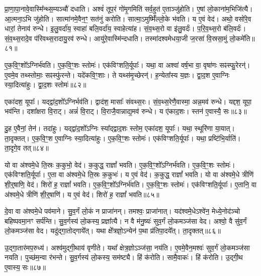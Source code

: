 प्रा॒णा॒पा॒नावे॒वास्मि᳚न्थ्स॒म्यञ्चौ॑ दधाति।
अश्वं॑ तूप॒रं गो॑मृ॒गमिति॑ सर्व॒हुत॑ ए॒ताञ्जु॑होति।
ए॒षां लो॒काना॑म॒भिजि॑त्यै।
आ॒त्मना॒ऽभि जु॑\-होति।
सात्मा॑नमे॒वैन॒ꣳ॒ सत॑नुं करोति।
सात्मा॒\-ऽमुष्मिँ॑ल्लो॒के भ॑वति।
य ए॒वं वेद॑।
अथो॒ वसो॑रे॒व धारां॒ तेनाव॑ रुन्धे।
इ॒लु॒\-वर्दा॑य॒ स्वाहा॑ बलि॒वर्दा॑य॒ स्वाहेत्या॑ह।
सं॒व॒थ्स॒रो वा इ॑लु॒वर्दः॑।
प॒रि॒\-व॒थ्स॒रो ब॑लि॒वर्दः॑।
सं॒व॒थ्स॒रा\-दे॒व प॑रि\-वथ्स॒रा\-दायु॒रव॑ रुन्धे।
आयु॑\-रे॒वा\-स्मि॑न्दधाति।
तस्मा॑दश्वमेधया॒जी ज॒रसा॑ वि॒स्रसा॒मुं लो॒कमे॑ति॥८१॥\ip\anuvakamend[तेज॒सो\-ऽव॑रुद्ध्यै भव॒न्त्यश्वो॑ गोमृ॒गमि॑लु॒वर्द॑श्च॒त्वारि॑ च]

ए॒क॒वि॒ꣳ॒शो᳚\-ऽग्निर्भ॑वति।
ए॒क॒वि॒ꣳ॒शः स्तोमः॑।
एक॑\-विꣳशति॒र्यूपाः᳚।
यथा॒ वा अश्वा॑ वर्\mbox{}ष॒भा वा॒ वृषा॑णः सꣴस्फु॒रेरन्॑।
ए॒वमे॒व तथ्स्तोमाः॒ सꣴस्फु॑रन्ते।
यदे॑कवि॒ꣳ॒शाः।
ते यथ्स॑मृ॒च्छेरन्॑।
ह॒न्येता᳚स्य य॒ज्ञः।
द्वा॒द॒श ए॒वाग्निः स्या॒दित्या॑हुः।
द्वा॒द॒शः स्तोमः॑॥८२॥\ip

एका॑दश॒ यूपाः᳚।
यद्द्वा॑द॒शो᳚\-ऽग्निर्भव॑ति।
द्वाद॑श॒ मासाः᳚ संवथ्स॒रः।
सं॒व॒थ्स॒रेणै॒वास्मा॒ अन्न॒मव॑ रुन्धे।
यद्दश॒ यूपा॒ भव॑न्ति।
दशा᳚क्षरा वि॒राट्।
अन्नं॑ वि॒राट्।
वि॒राजै॒वान्नाद्य॒मव॑ रुन्धे।
य ए॑काद॒शः।
स्तन॑ ए॒वास्यै॒ सः॥८३॥\ip

दु॒ह ए॒वैनां॒ तेन॑।
तदा॑हुः।
यद्द्वा॑द॒शो᳚\-ऽग्निः स्या᳚द्द्वाद॒शः स्तोम॒ एका॑दश॒ यूपाः᳚।
यथा॒ स्थूरि॑णा या॒यात्।
ता॒दृक्तत्।
ए॒क॒वि॒ꣳ॒श ए॒वाग्निः स्या॒दित्या॑हुः।
ए॒क॒वि॒ꣳ॒शः स्तोमः॑।
एक॑विꣳशति॒र्यूपाः᳚।
यथा॒ प्रष्टि॑भि॒र्याति॑।
ता॒दृगे॒व तत्॥८४॥\ip

यो वा अ॑श्वमे॒धे ति॒स्रः क॒कुभो॒ वेद॑।
क॒कुद्ध॒ राज्ञां᳚ भवति।
ए॒क॒वि॒ꣳ॒शो᳚\-ऽग्निर्भ॑वति।
ए॒क॒वि॒ꣳ॒शः स्तोमः॑।
एक॑विꣳशति॒र्यूपाः᳚।
ए॒ता वा अ॑श्वमे॒धे ति॒स्रः क॒कुभः॑।
य ए॒वं वेद॑।
क॒कुद्ध॒ राज्ञां᳚ भवति।
यो वा अ॑श्वमे॒धे त्रीणि॑ शी॒र्॒षाणि॒ वेद॑।
शिरो॑ ह॒ राज्ञां᳚ भवति।
ए॒क॒वि॒ꣳ॒शो᳚\-ऽग्निर्भ॑वति।
ए॒क॒वि॒ꣳ॒शः स्तोमः॑।
एक॑विꣳशति॒र्यूपाः᳚।
ए॒तानि॒ वा अ॑श्वमे॒धे त्रीणि॑ शी॒र्॒षाणि॑।
य ए॒वं वेद॑।
शिरो॑ ह॒ राज्ञां᳚ भवति॥८५॥\ip\anuvakamend[द्वा॒द॒शः स्तोमः॒ स ए॒व तच्छिरो॑ ह॒ राज्ञां᳚ भवति॒ षट् च॑]

दे॒वा वा अ॑श्वमे॒धे पव॑माने।
सु॒व॒र्गं लो॒कं न प्राजा॑नन्।
तमश्वः॒ प्राजा॑नात्।
यद॑श्वमे॒धे\-ऽश्वे॑न॒ मेध्ये॒नोद॑ञ्चो बहिष्पवमा॒नꣳ सर्प॑न्ति।
सु॒व॒र्गस्य॑ लो॒कस्य॒ प्रज्ञा᳚त्यै।
न वै म॑नु॒ष्यः॑ सुव॒र्गं लो॒कमञ्ज॑सा वेद।
अश्वो॒ वै सु॑व॒र्गं लो॒कमञ्ज॑सा वेद।
यदु॑द्गा॒तोद्गाये᳚त्।
यथा क्षे᳚त्रज्ञो॒\-ऽन्येन॑ प॒था प्र॑तिपा॒दये᳚त्।
ता॒दृक्तत्॥८६॥\ip

उ॒द्गा॒तार॑मप॒रुध्य॑।
अश्व॑मुद्गी॒थाय॑ वृणीते।
यथा᳚ क्षेत्र॒ज्ञो\-ऽञ्ज॑सा॒ नय॑ति।
ए॒वमे॒वैन॒मश्वः॑ सुव॒र्गं लो॒कमञ्ज॑सा नयति।
पुच्छ॑म॒न्वा र॑भन्ते।
सु॒व॒र्गस्य॑ लो॒कस्य॒ सम॑ष्ट्यै।
हिं क॑रोति।
सामै॒वाकः॑।
हिं क॑रोति।
उ॒द्गी॒थ ए॒वास्य॒ सः॥८७॥\ip

